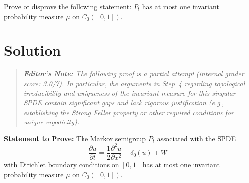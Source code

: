 Prove or disprove the following statement:  $P_t$ has at most one invariant probability measure $\mu$ on $C_0([0,1])$.

\section*{Solution}

\begin{quote}
\small \emph{\textbf{Editor's Note:} The following proof is a partial attempt (internal grader score: 3.0/7). In particular, the arguments in Step~4 regarding topological irreducibility and uniqueness of the invariant measure for this singular SPDE contain significant gaps and lack rigorous justification (e.g., establishing the Strong Feller property or other required conditions for unique ergodicity).}
\end{quote}

\noindent\textbf{Statement to Prove:} The Markov semigroup $P_t$ associated with the SPDE 
\[ \frac{\partial u}{\partial t} = \frac{1}{2} \frac{\partial^2 u}{\partial x^2} + \delta_0(u) +  \dot{W} \]
with Dirichlet boundary conditions on $[0,1]$ has at most one invariant probability measure $\mu$ on $C_0([0,1])$.

